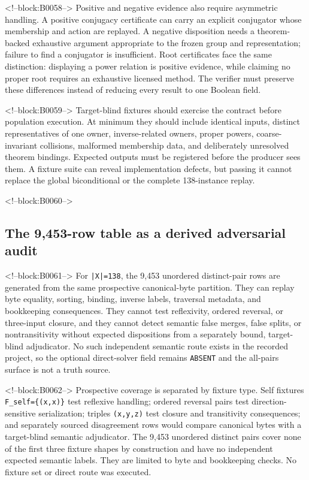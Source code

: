 \documentclass[11pt]{article}
\begin{document}
<!--block:B0058-->
Positive and negative evidence also require asymmetric handling. A
positive conjugacy certificate can carry an explicit conjugator whose
membership and action are replayed. A negative disposition needs a
theorem-backed exhaustive argument appropriate to the frozen group and
representation; failure to find a conjugator is insufficient. Root
certificates face the same distinction: displaying a power relation is
positive evidence, while claiming no proper root requires an exhaustive
licensed method. The verifier must preserve these differences instead
of reducing every result to one Boolean field.

<!--block:B0059-->
Target-blind fixtures should exercise the contract before population
execution. At minimum they should include identical inputs, distinct
representatives of one owner, inverse-related owners, proper powers,
coarse-invariant collisions, malformed membership data, and deliberately
unresolved theorem bindings. Expected outputs must be registered before
the producer sees them. A fixture suite can reveal implementation
defects, but passing it cannot replace the global biconditional or the
complete 138-instance replay.

<!--block:B0060-->
\hypertarget{43-the-9453-row-table-as-a-derived-adversarial-audit}{%
\subsection{The 9,453-row table as a derived adversarial
audit}\label{43-the-9453-row-table-as-a-derived-adversarial-audit}}

<!--block:B0061-->
For \texttt{|X|=138}, the 9,453 unordered distinct-pair rows are generated from
the same prospective canonical-byte partition.  They can replay byte equality,
sorting, binding, inverse labels, traversal metadata, and bookkeeping
consequences.  They cannot test reflexivity, ordered reversal, or three-input
closure, and they cannot detect semantic false merges, false splits, or
nontransitivity without expected dispositions from a separately bound,
target-blind adjudicator.  No such independent semantic route exists in the
recorded project, so the optional direct-solver field remains \texttt{ABSENT}
and the all-pairs surface is not a truth source.

<!--block:B0062-->
Prospective coverage is separated by fixture type.  Self fixtures
\texttt{F\_self=\{(x,x)\}} test reflexive handling; ordered reversal pairs test
direction-sensitive serialization; triples \texttt{(x,y,z)} test closure and
transitivity consequences; and separately sourced disagreement rows would
compare canonical bytes with a target-blind semantic adjudicator.  The 9,453
unordered distinct pairs cover none of the first three fixture shapes by
construction and have no independent expected semantic labels.  They are limited
to byte and bookkeeping checks.  No fixture set or direct route was executed.
\end{document}
